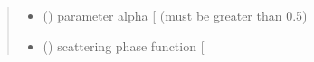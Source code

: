 \documentclass[letterpaper,10pt,english]{sphinxmanual}
\begin{document}
\begin{fulllineitems}
\begin{quote}
\begin{description}
\begin{itemize}
\item {} 
\sphinxAtStartPar
{} () \textendash{} parameter alpha {[}\sphinxhyphen{}{]} (must be greater than \sphinxhyphen{}0.5)

\end{itemize}

\sphinxAtStartPar
\begin{itemize}
\item {} 
\sphinxAtStartPar
{} () \textendash{} scattering phase function {[}\sphinxhyphen{}{]}

\end{itemize}


\end{description}\end{quote}

\end{fulllineitems}

\end{document}
